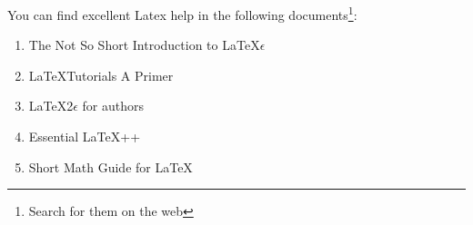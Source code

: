 You can find excellent Latex help in the following documents\footnote{Search for them on the web}:
\begin{enumerate}
\item The Not So Short Introduction to \LaTeX $\epsilon$ 
\item \LaTeX Tutorials A Primer
\item \LaTeX2$\epsilon$ for authors
\item Essential \LaTeX++
\item Short Math Guide for \LaTeX
\end{enumerate}